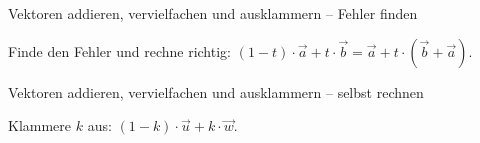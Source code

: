 \begin{aufgabe}{Vektoren addieren, vervielfachen und ausklammern – Fehler finden}
\begin{teile}
\teil Finde den Fehler und rechne richtig: $(1 - t) \cdot \vec{a} + t \cdot \vec{b} = \vec{a} + t \cdot (\vec{b} + \vec{a})$.
\end{teile}
\end{aufgabe}

\begin{aufgabe}{Vektoren addieren, vervielfachen und ausklammern – selbst rechnen}
\begin{teile}
\teil Klammere $k$ aus: $(1 - k) \cdot \vec{u} + k \cdot \vec{w}$. \leerfeld
\end{teile}
\end{aufgabe}
